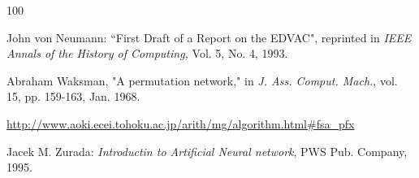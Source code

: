 \begin{thebibliography}{100}

 John von Neumann: ``First Draft of a Report on
 the EDVAC", reprinted in {\em IEEE Annals of the History of Computing,}
 Vol. 5, No. 4, 1993.




 Abraham Waksman, "A permutation network," in {\em J. Ass. Comput. Mach.}, vol. 15, pp. 159-163, Jan. 1968.




 \url{http://www.aoki.ecei.tohoku.ac.jp/arith/mg/algorithm.html#fsa_pfx}




 Jacek M. Zurada: {\em Introductin to Artificial Neural network}, PWS Pub. Company, 1995.




\end{thebibliography}
